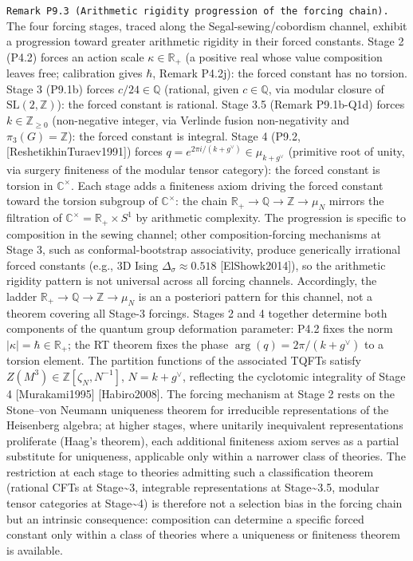 \documentclass[
]{article}
\begin{document}
\texttt{Remark\ P9.3\ (Arithmetic\ rigidity\ progression\ of\ the\ forcing\ chain).}
The four forcing stages, traced along the Segal-sewing/cobordism
channel, exhibit a progression toward greater arithmetic rigidity in
their forced constants. Stage 2 (P4.2) forces an action scale
\(\kappa \in \mathbb{R}_+\) (a positive real whose value composition
leaves free; calibration gives \(\hbar\), Remark P4.2j): the forced
constant has no torsion. Stage 3 (P9.1b) forces \(c/24 \in \mathbb{Q}\)
(rational, given \(c \in \mathbb{Q}\), via modular closure of
\(\mathrm{SL}(2,\mathbb{Z})\)): the forced constant is rational. Stage
3.5 (Remark P9.1b-Q1d) forces \(k \in \mathbb{Z}_{\geq 0}\)
(non-negative integer, via Verlinde fusion non-negativity and
\(\pi_3(G) = \mathbb{Z}\)): the forced constant is integral. Stage 4
(P9.2, {[}ReshetikhinTuraev1991{]}) forces
\(q = e^{2\pi i/(k+g^\vee)} \in \mu_{k+g^\vee}\) (primitive root of
unity, via surgery finiteness of the modular tensor category): the
forced constant is torsion in \(\mathbb{C}^\times\). Each stage adds a
finiteness axiom driving the forced constant toward the torsion subgroup
of \(\mathbb{C}^\times\): the chain
\(\mathbb{R}_+ \to \mathbb{Q} \to \mathbb{Z} \to \mu_N\) mirrors the
filtration of \(\mathbb{C}^\times = \mathbb{R}_+ \times S^1\) by
arithmetic complexity. The progression is specific to composition in the
sewing channel; other composition-forcing mechanisms at Stage 3, such as
conformal-bootstrap associativity, produce generically irrational forced
constants (e.g., 3D Ising \(\Delta_\sigma \approx 0.518\)
{[}ElShowk2014{]}), so the arithmetic rigidity pattern is not universal
across all forcing channels. Accordingly, the ladder
\(\mathbb{R}_+ \to \mathbb{Q} \to \mathbb{Z} \to \mu_N\) is an a
posteriori pattern for this channel, not a theorem covering all Stage-3
forcings. Stages 2 and 4 together determine both components of the
quantum group deformation parameter: P4.2 fixes the norm
\(\lvert\kappa\rvert = \hbar \in \mathbb{R}_+\); the RT theorem fixes
the phase \(\arg(q) = 2\pi/(k+g^\vee)\) to a torsion element. The
partition functions of the associated TQFTs satisfy
\(Z(M^3) \in \mathbb{Z}[\zeta_N, N^{-1}]\), \(N = k + g^\vee\),
reflecting the cyclotomic integrality of Stage 4 {[}Murakami1995{]}
{[}Habiro2008{]}. The forcing mechanism at Stage 2 rests on the
Stone--von Neumann uniqueness theorem for irreducible representations of
the Heisenberg algebra; at higher stages, where unitarily inequivalent
representations proliferate (Haag's theorem), each additional finiteness
axiom serves as a partial substitute for uniqueness, applicable only
within a narrower class of theories. The restriction at each stage to
theories admitting such a classification theorem (rational CFTs at
Stage\textasciitilde3, integrable representations at
Stage\textasciitilde3.5, modular tensor categories at
Stage\textasciitilde4) is therefore not a selection bias in the forcing
chain but an intrinsic consequence: composition can determine a specific
forced constant only within a class of theories where a uniqueness or
finiteness theorem is available.
\end{document}
